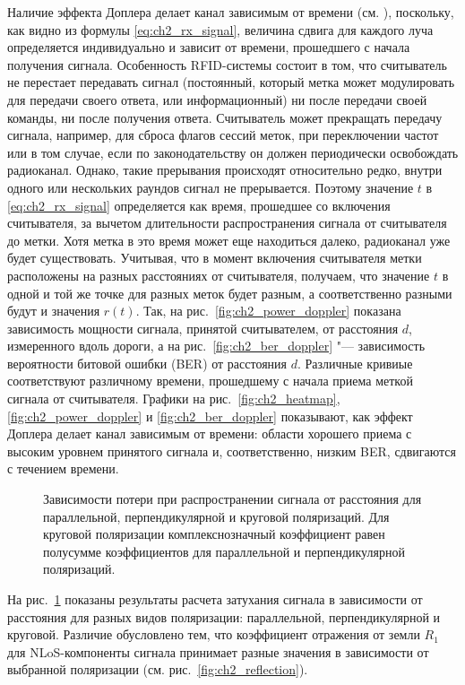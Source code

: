 Наличие эффекта Доплера делает канал зависимым от времени (см. \cite{Matz2011}), поскольку, как видно из формулы \eqref{eq:ch2_rx_signal}, величина сдвига для каждого луча определяется индивидуально и зависит от времени, прошедшего с начала получения сигнала. Особенность RFID-системы состоит в том, что считыватель не перестает передавать сигнал (постоянный, который метка может модулировать для передачи своего ответа, или информационный) ни после передачи своей команды, ни после получения ответа. Считыватель может прекращать передачу сигнала, например, для сброса флагов сессий меток, при переключении частот или в том случае, если по законодательству он должен периодически освобождать радиоканал. Однако, такие прерывания происходят относительно редко, внутри одного или нескольких раундов сигнал не прерывается. Поэтому значение $t$ в \eqref{eq:ch2_rx_signal} определяется как время, прошедшее со включения считывателя, за вычетом длительности распространения сигнала от считывателя до метки. Хотя метка в это время может еще находиться далеко, радиоканал уже будет существовать. Учитывая, что в момент включения считывателя метки расположены на разных расстояниях от считывателя, получаем, что значение $t$ в одной и той же точке для разных меток будет разным, а соответственно разными будут и значения $r(t)$. Так, на рис.~\ref{fig:ch2_power_doppler} показана зависимость мощности сигнала, принятой считывателем, от расстояния $d$, измеренного вдоль дороги, а на рис.~\ref{fig:ch2_ber_doppler} "--- зависимость вероятности битовой ошибки (BER) от расстояния $d$. Различные кривиые соответствуют различному времени, прошедшему с начала приема меткой сигнала от считывателя. Графики на рис.~\ref{fig:ch2_heatmap}, \ref{fig:ch2_power_doppler} и \ref{fig:ch2_ber_doppler} показывают, как эффект Доплера делает канал зависимым от времени: области хорошего приема с высоким уровнем принятого сигнала и, соответственно, низким BER, сдвигаются с течением времени. 

\begin{figure}[!t]
	\caption{Зависимости потери при распространении сигнала от расстояния для параллельной, перпендикулярной и круговой поляризаций. Для круговой поляризации комплекснозначный коэффициент равен полусумме коэффициентов для параллельной и перпендикулярной поляризаций.}
	\label{fig:ch2_pathloss_cases}
\end{figure}

На рис.~\ref{fig:ch2_pathloss_cases} показаны результаты расчета затухания сигнала в зависимости от расстояния для разных видов поляризации: параллельной, перпендикулярной и круговой. Различие обусловлено тем, что коэффициент отражения от земли $R_1$ для NLoS-компоненты сигнала принимает разные значения в зависимости от выбранной поляризации (см. рис.~\ref{fig:ch2_reflection}). 


